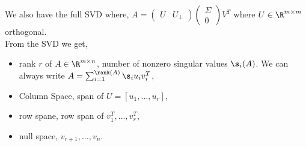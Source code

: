 \noindent
We also have the full SVD where, $A = \begin{pmatrix}
  U & U_\bot
\end{pmatrix} \begin{pmatrix}
  \Sigma \\ 0
\end{pmatrix} V^T$ where $U \in \R^{m \times m}$ orthogonal.\\

\noindent
From the SVD we get,
\begin{itemize}
  \item rank $r$ of $A \in \R^{m \times n}$, number of nonzero singular values $\s_i(A)$. We can always write $A = \sum_{i=1}^{\rank(A)} \s_i u_iv_i^T$,
  \item Column Space, span of $U = [u_1, \dots, u_r]$,
  \item row spane, row span of $v_1^T, \dots, v_r^T$,
  \item null space, $v_{r+1}, \dots, v_n$.
\end{itemize}